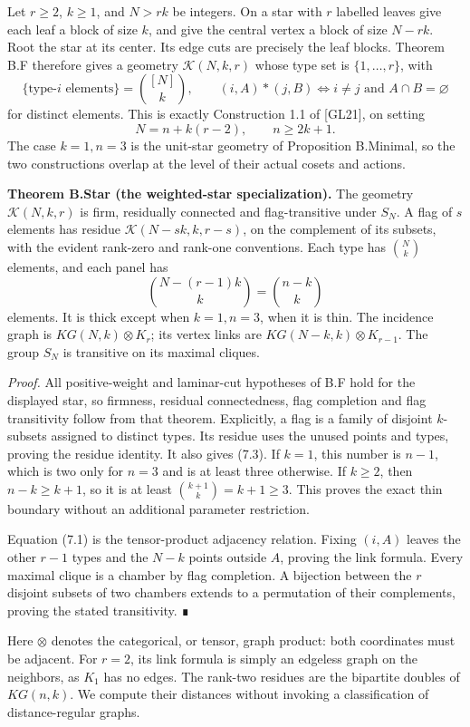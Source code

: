 \documentclass[
  11pt,
  a4paper,
]{article}
\begin{document}
Let \(r\geq2\), \(k\geq1\), and \(N>rk\) be integers. On a star with
\(r\) labelled leaves give each leaf a block of size \(k\), and give the
central vertex a block of size \(N-rk\). Root the star at its center.
Its edge cuts are precisely the leaf blocks. Theorem B.F therefore gives
a geometry \(\mathcal K(N,k,r)\) whose type set is \(\{1,\ldots,r\}\),
with \[
\{\text{type-}i\text{ elements}\}=\binom{[N]}k,
\qquad (i,A)*(j,B)\iff i\ne j\text{ and }A\cap B=\varnothing
\tag{7.1}
\] for distinct elements. This is exactly Construction 1.1 of
{[}GL21{]}, on setting \[
N=n+k(r-2),\qquad n\geq2k+1.
\tag{7.2}
\] The case \(k=1,n=3\) is the unit-star geometry of Proposition
B.Minimal, so the two constructions overlap at the level of their actual
cosets and actions.

\textbf{Theorem B.Star (the weighted-star specialization).} The geometry
\(\mathcal K(N,k,r)\) is firm, residually connected and flag-transitive
under \(S_N\). A flag of \(s\) elements has residue
\(\mathcal K(N-sk,k,r-s)\), on the complement of its subsets, with the
evident rank-zero and rank-one conventions. Each type has \(\binom Nk\)
elements, and each panel has \[
\binom{N-(r-1)k}{k}=\binom{n-k}{k}
\tag{7.3}
\] elements. It is thick except when \(k=1,n=3\), when it is thin. The
incidence graph is \(KG(N,k)\otimes K_r\); its vertex links are
\(KG(N-k,k)\otimes K_{r-1}\). The group \(S_N\) is transitive on its
maximal cliques.

\emph{Proof.} All positive-weight and laminar-cut hypotheses of B.F hold
for the displayed star, so firmness, residual connectedness, flag
completion and flag transitivity follow from that theorem. Explicitly, a
flag is a family of disjoint \(k\)-subsets assigned to distinct types.
Its residue uses the unused points and types, proving the residue
identity. It also gives (7.3). If \(k=1\), this number is \(n-1\), which
is two only for \(n=3\) and is at least three otherwise. If \(k\geq2\),
then \(n-k\geq k+1\), so it is at least \(\binom{k+1}k=k+1\geq3\). This
proves the exact thin boundary without an additional parameter
restriction.

Equation (7.1) is the tensor-product adjacency relation. Fixing
\((i,A)\) leaves the other \(r-1\) types and the \(N-k\) points outside
\(A\), proving the link formula. Every maximal clique is a chamber by
flag completion. A bijection between the \(r\) disjoint subsets of two
chambers extends to a permutation of their complements, proving the
stated transitivity. ∎

Here \(\otimes\) denotes the categorical, or tensor, graph product: both
coordinates must be adjacent. For \(r=2\), its link formula is simply an
edgeless graph on the neighbors, as \(K_1\) has no edges. The rank-two
residues are the bipartite doubles of \(KG(n,k)\). We compute their
distances without invoking a classification of distance-regular graphs.
\end{document}
